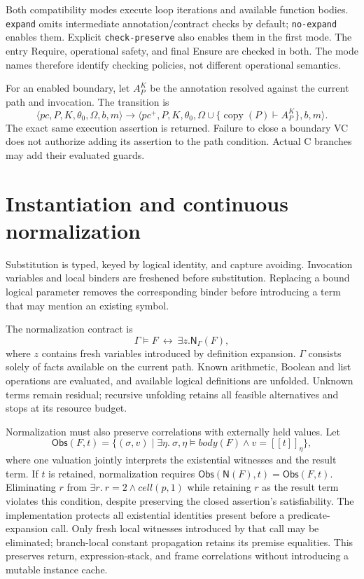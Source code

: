 \documentclass[10pt]{article}
\newcommand{\sem}[1]{[\![#1]\!]}
\newcommand{\Norm}{\mathsf{N}}
\begin{document}
Both compatibility modes execute loop iterations and available function
bodies. \texttt{expand} omits intermediate annotation/contract checks by
default; \texttt{no-expand} enables them. Explicit
\texttt{check-preserve} also enables them in the first mode.
The entry Require, operational safety, and final Ensure are checked in both.
The mode names therefore identify checking policies, not different operational
semantics.

For an enabled boundary, let $A^K_P$ be the annotation resolved against the
current path and invocation. The transition is
\[
 \langle pc,P,K,\theta_0,\Omega,b,m\rangle
 \longrightarrow
 \langle pc^+,P,K,\theta_0,
       \Omega\cup\{\operatorname{copy}(P)\vdash A^K_P\},b,m\rangle.
\]
The exact same execution assertion is returned. Failure to close a boundary
VC does not authorize adding its assertion to the path condition. Actual C
branches may add their evaluated guards.

\section{Instantiation and continuous normalization}
Substitution is typed, keyed by logical identity, and capture avoiding.
Invocation variables and local binders are freshened before substitution.
Replacing a bound logical parameter removes the corresponding binder before
introducing a term that may mention an existing symbol.

The normalization contract is
\[
 \Gamma\models F\ \longleftrightarrow\ \exists z.\Norm_\Gamma(F),
\]
where $z$ contains fresh variables introduced by definition expansion.
$\Gamma$ consists solely of facts available on the current path.
Known arithmetic, Boolean and list operations are evaluated, and available
logical definitions are unfolded. Unknown terms remain residual; recursive
unfolding retains all feasible alternatives and stops at its resource budget.

Normalization must also preserve correlations with externally held values.
Let
\[
 \mathsf{Obs}(F,t)=\{(\sigma,v)\mid
  \exists\eta.\ \sigma,\eta\models\mathit{body}(F)
  \land v=\sem{t}_\eta\},
\]
where one valuation jointly interprets the existential witnesses and the
result term. If $t$ is retained, normalization requires
$\mathsf{Obs}(\Norm(F),t)=\mathsf{Obs}(F,t)$.
Eliminating $r$ from $\exists r.\ r=2\land\mathit{cell}(p,1)$ while retaining
$r$ as the result term violates this condition, despite preserving the
closed assertion's satisfiability.
The implementation protects all existential identities present before a
predicate-expansion call. Only fresh local witnesses introduced by that
call may be eliminated; branch-local constant propagation retains its
premise equalities. This preserves return, expression-stack, and frame
correlations without introducing a mutable instance cache.
\end{document}

